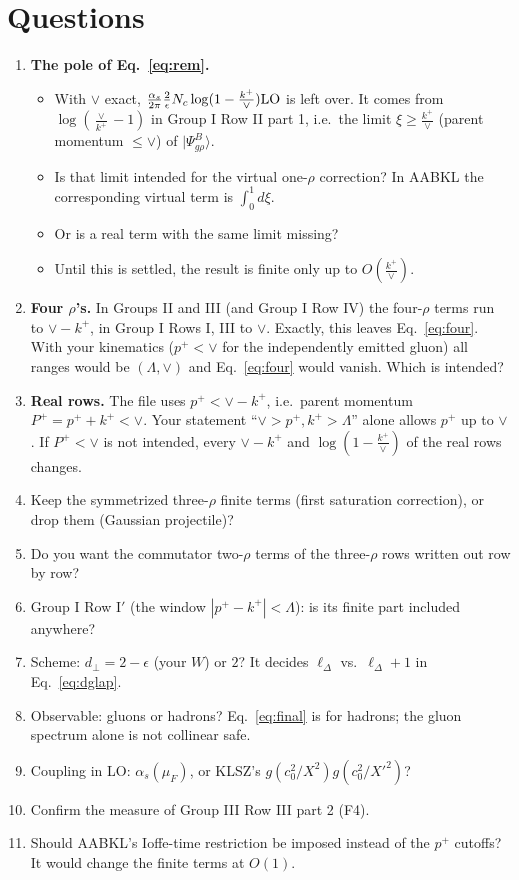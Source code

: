 \documentclass[10pt]{article}
\numberwithin{equation}{section}
\begin{document}
\section{Questions}\label{sec:questions}
\begin{enumerate}
\item[\textbf{Q1}] \textbf{The pole of Eq.~\eqref{eq:rem}.}
\begin{itemize}
\item With $\vee$ exact, $\frac{\alpha_s}{2\pi}\frac2\epsilon N_c\log(1-\frac{k^+}{\vee}){\rm LO}$ is left over. It comes from $\log(\frac{\vee}{k^+}-1)$ in Group I Row II part 1, i.e.\ the limit $\xi\ge\frac{k^+}{\vee}$ (parent momentum $\le\vee$) of $|\Psi^B_{g\rho}\rangle$.
\item Is that limit intended for the virtual one-$\rho$ correction? In AABKL the corresponding virtual term is $\int_0^1d\xi$.
\item Or is a real term with the same limit missing?
\item Until this is settled, the result is finite only up to $O(\frac{k^+}{\vee})$.
\end{itemize}
\item[\textbf{Q2}] \textbf{Four $\rho$'s.} In Groups II and III (and Group I Row IV) the four-$\rho$ terms run to $\vee-k^+$, in Group I Rows I, III to $\vee$. Exactly, this leaves Eq.~\eqref{eq:four}. With your kinematics ($p^+<\vee$ for the independently emitted gluon) all ranges would be $(\Lambda,\vee)$ and Eq.~\eqref{eq:four} would vanish. Which is intended?
\item[\textbf{Q3}] \textbf{Real rows.} The file uses $p^+<\vee-k^+$, i.e.\ parent momentum $P^+=p^++k^+<\vee$. Your statement ``$\vee>p^+,k^+>\Lambda$'' alone allows $p^+$ up to $\vee$. If $P^+<\vee$ is not intended, every $\vee-k^+$ and $\log(1-\frac{k^+}{\vee})$ of the real rows changes.
\item[\textbf{Q4}] Keep the symmetrized three-$\rho$ finite terms (first saturation correction), or drop them (Gaussian projectile)?
\item[\textbf{Q5}] Do you want the commutator two-$\rho$ terms of the three-$\rho$ rows written out row by row?
\item[\textbf{Q6}] Group I Row I$'$ (the window $|p^+-k^+|<\Lambda$): is its finite part included anywhere?
\item[\textbf{Q7}] Scheme: $d_\perp=2-\epsilon$ (your $W$) or $2$? It decides $\ell_\Delta$ vs.\ $\ell_\Delta+1$ in Eq.~\eqref{eq:dglap}.
\item[\textbf{Q8}] Observable: gluons or hadrons? Eq.~\eqref{eq:final} is for hadrons; the gluon spectrum alone is not collinear safe.
\item[\textbf{Q9}] Coupling in LO: $\alpha_s(\mu_F)$, or KLSZ's $g(c_0^2/X^2)g(c_0^2/X'^2)$?
\item[\textbf{Q10}] Confirm the measure of Group III Row III part 2 (F4).
\item[\textbf{Q11}] Should AABKL's Ioffe-time restriction be imposed instead of the $p^+$ cutoffs? It would change the finite terms at $O(1)$.
\end{enumerate}
\end{document}
